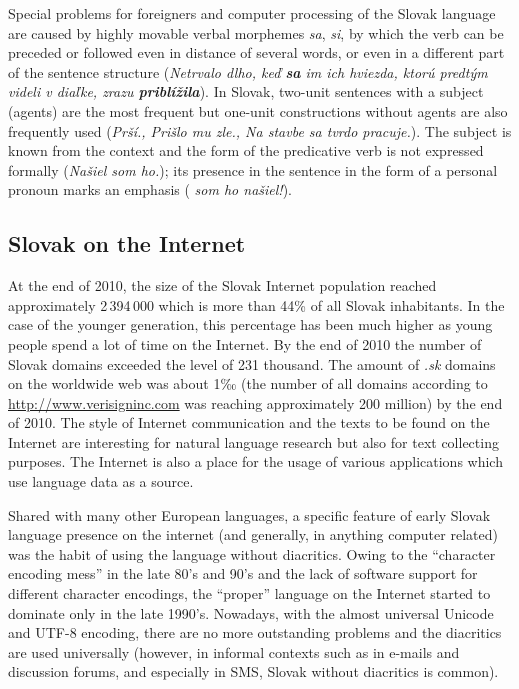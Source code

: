 \begin{multicols}{2}

Special problems for foreigners and computer processing of the Slovak language are caused by highly movable verbal morphemes \emph{sa}, \emph{si}, by which the verb can be preceded or followed even in distance of several words, or even in a different part of the sentence structure (\emph{Netrvalo dlho, keď \textbf{sa} im ich hviezda, ktorú predtým videli v diaľke, zrazu \textbf{priblížila}}). In Slovak, two-unit sentences with a subject (agents) are the most frequent but one-unit constructions without agents are also frequently used (\emph{Prší., Prišlo mu zle., Na stavbe sa tvrdo pracuje.}). The subject is known from the context and the form of the predicative verb is not expressed formally (\emph{Našiel som ho.}); its presence in the sentence in the form of a personal pronoun marks an emphasis (\emph{ som ho našiel!}).

\subsection{Slovak on the Internet}
At the end of 2010, the size of the Slovak Internet population reached
approximately 2\,394\,000 which is more than 44\% of all Slovak
inhabitants. In the case of the younger generation, this percentage has
been much higher as young people spend a lot of time on the Internet. By
the end of 2010 the number of Slovak domains exceeded the level of 231
thousand\cite{f3}.
The amount of \emph{.sk} domains on the worldwide web was about
1‰ (the number of all domains according to \url{http://www.verisigninc.com} was reaching approximately 200 million) by the end of 2010. The style of Internet
communication and the texts to be found on the Internet are interesting
for natural language research but also for text collecting purposes. The 
Internet is also a place for the usage of various applications which use
language data as a source.  

Shared with many other European languages, a specific feature of early
Slovak language presence on the internet (and generally, in anything computer related) was the habit of using the language without
diacritics. Owing to the “character encoding mess” in the late 80's
and 90's and the lack of software support for different character
encodings, the “proper” language on the Internet started to dominate
only in the late 1990's. Nowadays, with the almost universal Unicode and
UTF-8 encoding, there are no more outstanding problems and the
diacritics are used universally (however, in informal contexts such as
in e-mails and discussion forums, and especially in SMS, Slovak without
diacritics is common). 


\end{multicols}
